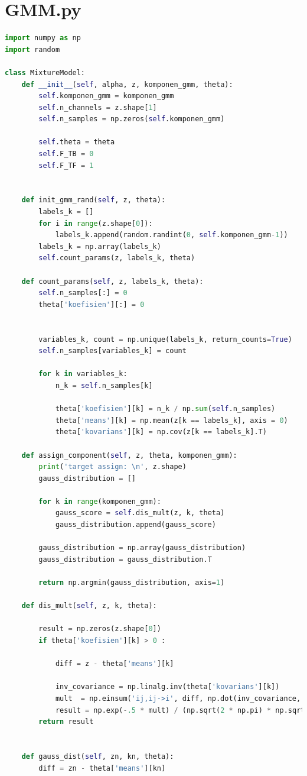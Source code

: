 \section{GMM.py}
\begin{lstlisting}[language=Python, basicstyle=\tiny]
import numpy as np
import random

class MixtureModel:
	def __init__(self, alpha, z, komponen_gmm, theta):
		self.komponen_gmm = komponen_gmm
		self.n_channels = z.shape[1]
		self.n_samples = np.zeros(self.komponen_gmm)

		self.theta = theta
		self.F_TB = 0
		self.F_TF = 1


	def init_gmm_rand(self, z, theta):
		labels_k = []
		for i in range(z.shape[0]):
			labels_k.append(random.randint(0, self.komponen_gmm-1))
		labels_k = np.array(labels_k)
		self.count_params(z, labels_k, theta)

	def count_params(self, z, labels_k, theta):
		self.n_samples[:] = 0
		theta['koefisien'][:] = 0   


		variables_k, count = np.unique(labels_k, return_counts=True)
		self.n_samples[variables_k] = count

		for k in variables_k:
			n_k = self.n_samples[k]

			theta['koefisien'][k] = n_k / np.sum(self.n_samples)
			theta['means'][k] = np.mean(z[k == labels_k], axis = 0)
			theta['kovarians'][k] = np.cov(z[k == labels_k].T) 

	def assign_component(self, z, theta, komponen_gmm):
		print('target assign: \n', z.shape)
		gauss_distribution = []

		for k in range(komponen_gmm):
			gauss_score = self.dis_mult(z, k, theta)
			gauss_distribution.append(gauss_score)

		gauss_distribution = np.array(gauss_distribution)
		gauss_distribution = gauss_distribution.T

		return np.argmin(gauss_distribution, axis=1)

	def dis_mult(self, z, k, theta):

		result = np.zeros(z.shape[0])
		if theta['koefisien'][k] > 0 :

			diff = z - theta['means'][k]

			inv_covariance = np.linalg.inv(theta['kovarians'][k])
			mult  = np.einsum('ij,ij->i', diff, np.dot(inv_covariance, diff.T).T)
			result = np.exp(-.5 * mult) / (np.sqrt(2 * np.pi) * np.sqrt(np.linalg.det(theta['kovarians'][k])))
		return result


	def gauss_dist(self, zn, kn, theta):
		diff = zn - theta['means'][kn]


\end{lstlisting}
